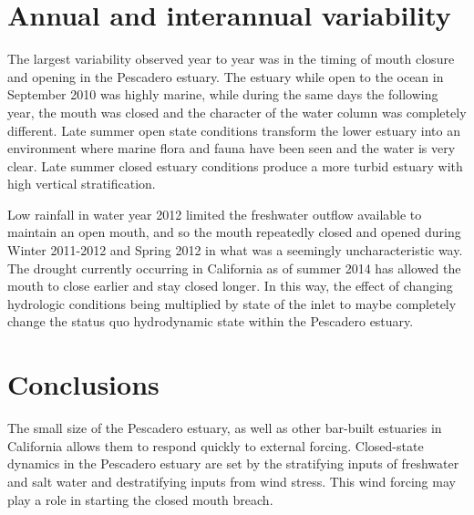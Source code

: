 \section{Annual and interannual variability} \label{sec:annvar}

The largest variability observed year to year was in the timing of mouth closure and opening in the Pescadero estuary. The estuary while open to the ocean in September 2010 was highly marine, while during the same days the following year, the mouth was closed and the character of the water column was completely different. Late summer open state conditions transform the lower estuary into an environment where marine flora and fauna have been seen and the water is very clear. Late summer closed estuary conditions produce a more turbid estuary with high vertical stratification. 

Low rainfall in water year 2012 limited the freshwater outflow available to maintain an open mouth, and so the mouth repeatedly closed and opened during Winter 2011-2012 and Spring 2012 in what was a seemingly uncharacteristic way. The drought currently occurring in California as of summer 2014 has allowed the mouth to close earlier and stay closed longer. In this way, the effect of changing hydrologic conditions being multiplied by state of the inlet to maybe completely change the status quo hydrodynamic state within the Pescadero estuary. 


\section{Conclusions} \label{backofch2}
The small size of the Pescadero estuary, as well as other bar-built estuaries in California allows them to respond quickly to external forcing. Closed-state dynamics in the Pescadero estuary are set by the stratifying inputs of freshwater and salt water and destratifying inputs from wind stress. This wind forcing may play a role in starting the closed mouth breach. 

